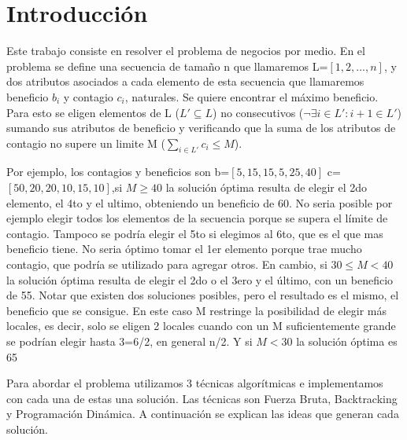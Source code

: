 \documentclass[10pt,a4paper]{article}
\begin{document}

\fecha{}



\maketitle

\newpage
\setcounter{page}{1}

\section{Introducción} \label{sec:introduccion}
Este trabajo consiste en resolver el problema de negocios por medio. En el problema se define una secuencia de tamaño n que llamaremos L=$[1,2,...,n]$, y dos atributos asociados a cada elemento de esta secuencia que llamaremos beneficio $b_i$ y contagio $c_i$, naturales. Se quiere encontrar el máximo beneficio. Para esto se eligen elementos de L ($L' \subseteq L $) no consecutivos ($\neg \exists i \in L' : i+1 \in L'$)  sumando sus atributos de beneficio y verificando  que la suma de los atributos de contagio no supere un limite M ($\sum_{i\in L'}c_i \leq M$). 

Por ejemplo, los contagios y beneficios son b=$[5,15,15,5,25,40]$ c=$[50,20,20,10,15,10]$,si $M \geq 40$ la solución óptima resulta de elegir el 2do elemento, el 4to y el ultimo, obteniendo un beneficio de 60. No seria posible por ejemplo elegir todos los elementos de la secuencia porque se supera el límite de contagio. Tampoco se podría elegir el 5to si elegimos al 6to, que es el que mas beneficio tiene. No seria óptimo tomar el 1er elemento porque trae mucho contagio, que podría se utilizado para agregar otros. En cambio, si $ 30 \leq M < 40$ la solución óptima resulta de elegir el 2do o el 3ero y el último, con un beneficio de 55. Notar que existen dos soluciones posibles, pero el resultado es el mismo, el beneficio que se consigue. En este caso M restringe la posibilidad de elegir más locales, es decir, solo se eligen 2 locales cuando con un M suficientemente grande se podrían elegir hasta 3=6/2, en general n/2.  Y si $M<30$ la solución óptima es 65

Para abordar el problema utilizamos 3 técnicas algorítmicas e implementamos con cada una de estas una solución. Las técnicas son Fuerza Bruta, Backtracking y Programación Dinámica. A continuación se explican las ideas que generan cada solución.
\end{document}
